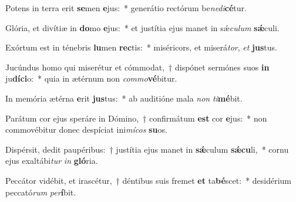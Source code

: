 \item Potens in terra erit \textbf{se}men \textbf{e}jus:~* generátio rectórum be\textit{ne}\textit{di}\textbf{cé}tur.
\item Glória, et divítiæ in \textbf{do}mo \textbf{e}jus:~* et justítia ejus manet in sǽ\textit{cu}\textit{lum} \textbf{sǽ}culi.
\item Exórtum est in ténebris \textbf{lu}men \textbf{rec}tis:~* miséricors, et miserá\textit{tor}, \textit{et} \textbf{jus}tus.
\item Jucúndus homo qui miserétur et cómmodat,~† dispónet sermónes suos \textbf{in} ju\textbf{dí}\textbf{ci}o:~* quia in ætérnum non \textit{com}\textit{mo}\textbf{vé}bitur.
\item In memória ætérna \textbf{e}rit \textbf{jus}tus:~* ab auditióne mala \textit{non} \textit{ti}\textbf{mé}bit.
\item Parátum cor ejus speráre in Dómino,~† confirmátum \textbf{est} cor \textbf{e}jus:~* non commovébitur donec despíciat ini\textit{mí}\textit{cos} \textbf{su}os.
\item Dispérsit, dedit paupéribus:~† justítia ejus manet in \textbf{sǽ}culum \textbf{sǽ}\textbf{cu}li,~* cornu ejus exaltábi\textit{tur} \textit{in} \textbf{gló}ria.
\item Peccátor vidébit, et irascétur,~† déntibus suis fremet \textbf{et} ta\textbf{bé}scet:~* desidérium peccató\textit{rum} \textit{per}\textbf{í}bit.
